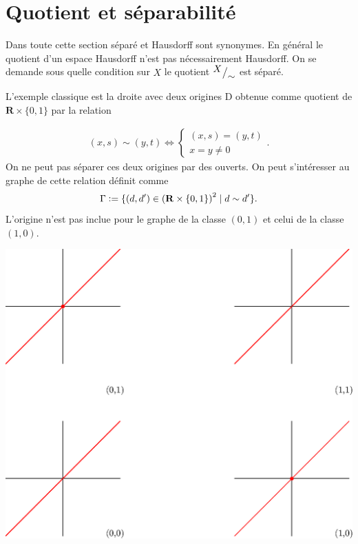 \documentclass[main.tex]{subfiles}
\begin{document}
	\section{Quotient et séparabilité}
	Dans toute cette section séparé et Hausdorff sont synonymes. En général le quotient d'un espace Hausdorff n'est pas nécessairement Hausdorff. On se demande sous quelle condition sur $X$ le quotient ${^{\textstyle X}\big/_{\textstyle \sim}}$ est séparé.
	\begin{example}
		L'exemple classique est la droite avec deux origines D obtenue comme quotient de $\mathbf{R}\times \{0,1\}$ par la relation \\
		\begin{minipage}{0.5\textwidth}
			\begin{align*}
				(x,s) \sim (y,t) \iff \begin{cases}
					(x,s) = (y,t) \\
					x = y \neq 0
				\end{cases}
			.\end{align*}
			On ne peut pas séparer ces deux origines par des ouverts. On peut s'intéresser au graphe de cette relation définit comme \[\Gamma \vcentcolon= \{(d,d') \in {(\mathbf{R}\times \{0,1\})}^2  \;|\; d\sim d'\}.\] L'origine n'est pas inclue pour le graphe de la classe $(0,1)$ et celui de la classe $(1,0)$.
		\end{minipage}
		\hfill
		\begin{minipage}{0.5\textwidth}
			\centering
			\includegraphics[scale=0.5]{graph.eps}
		\end{minipage}
	\end{example}
\end{document}
